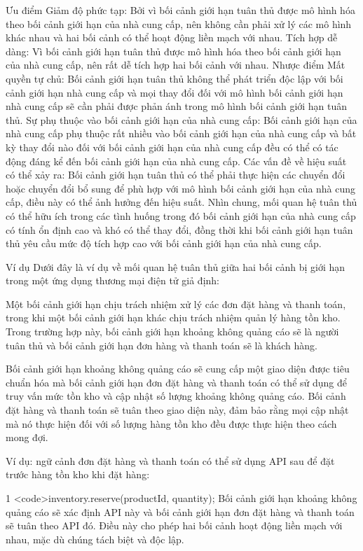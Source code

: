 Ưu điểm
Giảm độ phức tạp: Bởi vì bối cảnh giới hạn tuân thủ được mô hình hóa theo bối cảnh giới hạn của nhà cung cấp, nên không cần phải xử lý các mô hình khác nhau và hai bối cảnh có thể hoạt động liền mạch với nhau.
Tích hợp dễ dàng: Vì bối cảnh giới hạn tuân thủ được mô hình hóa theo bối cảnh giới hạn của nhà cung cấp, nên rất dễ tích hợp hai bối cảnh với nhau.
Nhược điểm
Mất quyền tự chủ: Bối cảnh giới hạn tuân thủ không thể phát triển độc lập với bối cảnh giới hạn nhà cung cấp và mọi thay đổi đối với mô hình bối cảnh giới hạn nhà cung cấp sẽ cần phải được phản ánh trong mô hình bối cảnh giới hạn tuân thủ.
Sự phụ thuộc vào bối cảnh giới hạn của nhà cung cấp: Bối cảnh giới hạn của nhà cung cấp phụ thuộc rất nhiều vào bối cảnh giới hạn của nhà cung cấp và bất kỳ thay đổi nào đối với bối cảnh giới hạn của nhà cung cấp đều có thể có tác động đáng kể đến bối cảnh giới hạn của nhà cung cấp.
Các vấn đề về hiệu suất có thể xảy ra: Bối cảnh giới hạn tuân thủ có thể phải thực hiện các chuyển đổi hoặc chuyển đổi bổ sung để phù hợp với mô hình bối cảnh giới hạn của nhà cung cấp, điều này có thể ảnh hưởng đến hiệu suất.
Nhìn chung, mối quan hệ tuân thủ có thể hữu ích trong các tình huống trong đó bối cảnh giới hạn của nhà cung cấp có tính ổn định cao và khó có thể thay đổi, đồng thời khi bối cảnh giới hạn tuân thủ yêu cầu mức độ tích hợp cao với bối cảnh giới hạn của nhà cung cấp.

Ví dụ
Dưới đây là ví dụ về mối quan hệ tuân thủ giữa hai bối cảnh bị giới hạn trong một ứng dụng thương mại điện tử giả định:

Một bối cảnh giới hạn chịu trách nhiệm xử lý các đơn đặt hàng và thanh toán, trong khi một bối cảnh giới hạn khác chịu trách nhiệm quản lý hàng tồn kho. Trong trường hợp này, bối cảnh giới hạn khoảng không quảng cáo sẽ là người tuân thủ và bối cảnh giới hạn đơn hàng và thanh toán sẽ là khách hàng.

Bối cảnh giới hạn khoảng không quảng cáo sẽ cung cấp một giao diện được tiêu chuẩn hóa mà bối cảnh giới hạn đơn đặt hàng và thanh toán có thể sử dụng để truy vấn mức tồn kho và cập nhật số lượng khoảng không quảng cáo. Bối cảnh đặt hàng và thanh toán sẽ tuân theo giao diện này, đảm bảo rằng mọi cập nhật mà nó thực hiện đối với số lượng hàng tồn kho đều được thực hiện theo cách mong đợi.

Ví dụ: ngữ cảnh đơn đặt hàng và thanh toán có thể sử dụng API sau để đặt trước hàng tồn kho khi đặt hàng:

1
<code>inventory.reserve(productId, quantity);
Bối cảnh giới hạn khoảng không quảng cáo sẽ xác định API này và bối cảnh giới hạn đơn đặt hàng và thanh toán sẽ tuân theo API đó. Điều này cho phép hai bối cảnh hoạt động liền mạch với nhau, mặc dù chúng tách biệt và độc lập.

